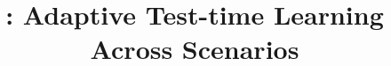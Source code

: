 \documentclass{article}
\title{\method: Adaptive Test-time Learning Across Scenarios}
\begin{document}
\maketitle






\FloatBarrier



\FloatBarrier




\clearpage
\appendix


\clearpage

\end{document}

